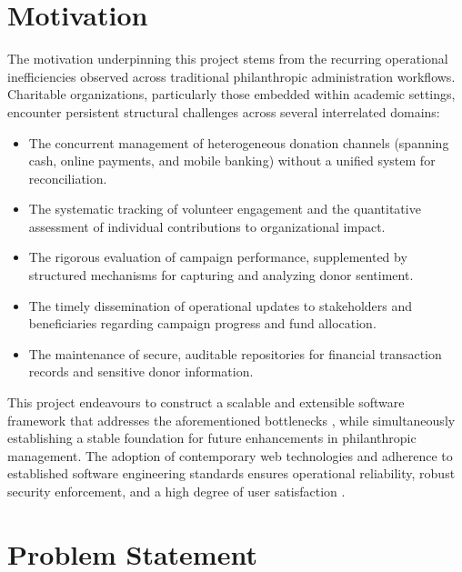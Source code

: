 \documentclass{thesis-library}
\begin{document}
\section{Motivation}
The motivation underpinning this project stems from the recurring operational inefficiencies observed across traditional philanthropic administration workflows. Charitable organizations, particularly those embedded within academic settings, encounter persistent structural challenges across several interrelated domains:
\begin{itemize}
    \item The concurrent management of heterogeneous donation channels (spanning cash, online payments, and mobile banking) without a unified system for reconciliation.
    \item The systematic tracking of volunteer engagement and the quantitative assessment of individual contributions to organizational impact.
    \item The rigorous evaluation of campaign performance, supplemented by structured mechanisms for capturing and analyzing donor sentiment.
    \item The timely dissemination of operational updates to stakeholders and beneficiaries regarding campaign progress and fund allocation.
    \item The maintenance of secure, auditable repositories for financial transaction records and sensitive donor information.
\end{itemize}

This project endeavours to construct a scalable and extensible software framework that addresses the aforementioned bottlenecks \cite{jones2023modern}, while simultaneously establishing a stable foundation for future enhancements in philanthropic management. The adoption of contemporary web technologies and adherence to established software engineering standards ensures operational reliability, robust security enforcement, and a high degree of user satisfaction \cite{wang2021enhancing}.

\section{Problem Statement}
\end{document}
